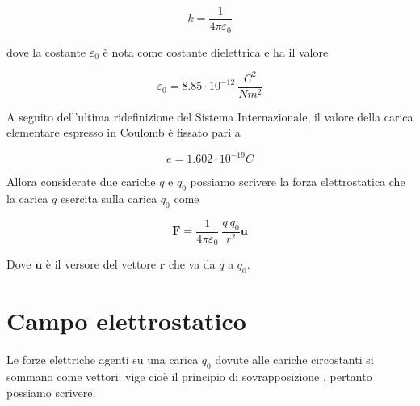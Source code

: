 \begin{tcolorbox}[colback=yellow!10!white, colframe=orange!70!black, boxrule=0.8pt]
\begin{equation*}
    k = \frac{1}{4 \pi \varepsilon_0}
\end{equation*}
\end{tcolorbox}

dove la costante $\varepsilon_0$ è nota come costante dielettrica  e ha il valore 

\begin{tcolorbox}[colback=yellow!10!white, colframe=orange!70!black, boxrule=0.8pt]
\begin{equation}
    \varepsilon_0 = 8.85 \cdot 10^{-12} \ \frac{C^2}{Nm^2}
\end{equation}
\end{tcolorbox}

A seguito dell'ultima ridefinizione del Sistema Internazionale, il valore della carica elementare  espresso in Coulomb è fissato pari a 

\begin{tcolorbox}[colback=yellow!10!white, colframe=orange!70!black, boxrule=0.8pt]
\begin{equation}
    e = 1.602 \cdot 10^{-19} C
\end{equation}
\end{tcolorbox}

\newpage

Allora considerate due cariche $q$ e $q_0$ possiamo scrivere la forza elettrostatica che la carica $q$ esercita sulla carica $q_0$ come

\begin{tcolorbox}[colback=yellow!10!white, colframe=orange!70!black, boxrule=0.8pt]
\begin{equation}
    \mathbf{F} = \frac{1}{4 \pi \varepsilon_0} \ \frac{q \ q_0}{r^2} \mathbf{u}
\end{equation}
\end{tcolorbox}

Dove $\mathbf{u}$ è il versore del vettore $\mathbf{r}$ che va da $q$ a $q_0$.\\

\section{Campo elettrostatico}

Le forze elettriche agenti su una carica $q_0$ dovute alle cariche circostanti si sommano come vettori: vige cioè il principio di sovrapposizione , pertanto possiamo scrivere. 


